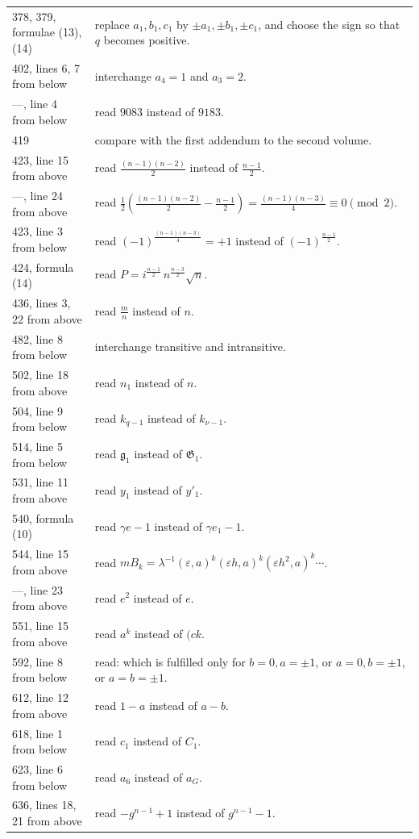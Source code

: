 \documentclass[11pt]{article}
\begin{document}
\begin{longtable}{p{}p{}}
378, 379, formulae (13), (14) & replace $a_1,b_1,c_1$ by $\pm a_1,\pm b_1,\pm c_1$, and choose the sign so that $q$ becomes positive.\\
402, lines 6, 7 from below & interchange $a_4=1$ and $a_3=2$.\\
---, line 4 from below & read $9083$ instead of $9183$.\\
419 & compare with the first addendum to the second volume.\\
423, line 15 from above & read $\frac{(n-1)(n-2)}{2}$ instead of $\frac{n-1}{2}$.\\
---, line 24 from above & read $\frac12\left(\frac{(n-1)(n-2)}{2}-\frac{n-1}{2}\right)=\frac{(n-1)(n-3)}{4}\equiv0\pmod2$.\\
423, line 3 from below & read $(-1)^{\frac{(n-1)(n-3)}{4}}=+1$ instead of $(-1)^{\frac{n-1}{2}}$.\\
424, formula (14) & read $P=i^{\frac{n-1}{2}}\,n^{\frac{n-3}{2}}\sqrt n$.\\
436, lines 3, 22 from above & read $\frac{m}{n}$ instead of $n$.\\
482, line 8 from below & interchange transitive and intransitive.\\
502, line 18 from above & read $n_1$ instead of $n$.\\
504, line 9 from below & read $k_{q-1}$ instead of $k_{\nu-1}$.\\
514, line 5 from below & read $\mathfrak g_1$ instead of $\mathfrak G_1$.\\
531, line 11 from above & read $y_1$ instead of $y'_1$.\\
540, formula (10) & read $\gamma e-1$ instead of $\gamma e_1-1$.\\
544, line 15 from above & read $mB_k=\lambda^{-1}(\varepsilon,a)^k(\varepsilon h,a)^k(\varepsilon h^2,a)^k\cdots$.\\
---, line 23 from above & read $e^2$ instead of $e$.\\
551, line 15 from above & read $a^k$ instead of $(ck$.\\
592, line 8 from below & read: which is fulfilled only for $b=0,a=\pm1$, or $a=0,b=\pm1$, or $a=b=\pm1$.\\
612, line 12 from above & read $1-a$ instead of $a-b$.\\
618, line 1 from below & read $c_1$ instead of $C_1$.\\
623, line 6 from below & read $a_6$ instead of $a_G$.\\
636, lines 18, 21 from above & read $-g^{n-1}+1$ instead of $g^{n-1}-1$.\\

\end{longtable}
\end{document}
